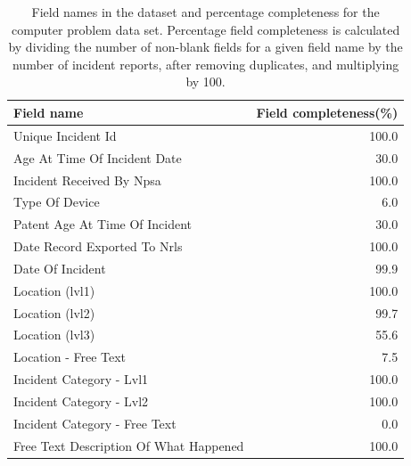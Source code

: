 \begin{table}[htbp]\centering
\begin{tabular}{lr}
\toprule
\textbf{Field name} & \textbf{Field completeness{(\%)}}\\
\midrule
Unique Incident Id & 100.0 \\
Age At Time Of Incident	Date & 30.0 \\
Incident Received By Npsa & 100.0\\	
Type Of Device & 6.0 \\
Patent Age At Time Of Incident & 30.0 \\
Date Record Exported To Nrls & 100.0\\
Date Of Incident & 99.9 \\
Location (lvl1) & 100.0 \\
Location (lvl2) & 99.7 \\
Location (lvl3) & 55.6 \\
Location - Free Text & 7.5 \\
Incident Category - Lvl1 & 100.0 \\
Incident Category - Lvl2 & 100.0 \\
Incident Category - Free Text & 0.0 \\
Free Text Description Of What Happened & 100.0\\
\bottomrule
\end{tabular}
\caption{Field names in the dataset and percentage completeness for the computer problem data set. Percentage field completeness is calculated by dividing the number of non-blank fields for a given field name by the number of incident reports, after removing duplicates, and multiplying by 100.}
\label{tab:field_names1}
\end{table}


